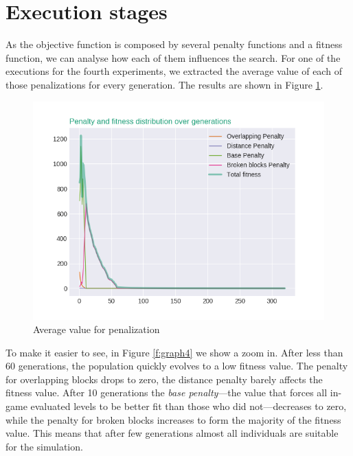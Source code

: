 \section{Execution stages}
As the objective function is composed by several penalty functions and a fitness function, we can analyse how each of them influences the search. For one of the executions for the fourth experiments, we extracted the average value of each of those penalizations for every generation. The results are shown in Figure \ref{f:graph3}. 
\begin{figure}[H]
	\centering
	\includegraphics[scale=0.6]{gfx/penalty_evolution_lines.png}
	\caption{Average value for penalization}\label{f:graph3}
\end{figure}

To make it easier to see, in Figure \ref{f:graph4} we show a zoom in. After less than 60 generations, the population quickly evolves to a low fitness value. The penalty for overlapping blocks drops to zero, the distance penalty barely affects the fitness value. After 10 generations the \textit{base penalty}---the value that forces all in-game evaluated levels to be better fit than those who did not---decreases to zero, while the penalty for broken blocks increases to form the majority of the fitness value. This means that after few generations almost all individuals are suitable for the simulation. %

